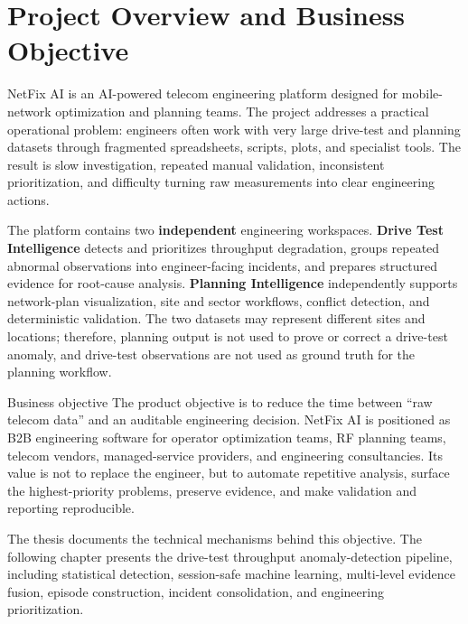 \chapter*{Project Overview and Business Objective}

NetFix AI is an AI-powered telecom engineering platform designed for mobile-network optimization and planning teams. The project addresses a practical operational problem: engineers often work with very large drive-test and planning datasets through fragmented spreadsheets, scripts, plots, and specialist tools. The result is slow investigation, repeated manual validation, inconsistent prioritization, and difficulty turning raw measurements into clear engineering actions.

The platform contains two \textbf{independent} engineering workspaces. \textbf{Drive Test Intelligence} detects and prioritizes throughput degradation, groups repeated abnormal observations into engineer-facing incidents, and prepares structured evidence for root-cause analysis. \textbf{Planning Intelligence} independently supports network-plan visualization, site and sector workflows, conflict detection, and deterministic validation. The two datasets may represent different sites and locations; therefore, planning output is not used to prove or correct a drive-test anomaly, and drive-test observations are not used as ground truth for the planning workflow.

\begin{infobox}{Business objective}
The product objective is to reduce the time between ``raw telecom data'' and an auditable engineering decision. NetFix AI is positioned as B2B engineering software for operator optimization teams, RF planning teams, telecom vendors, managed-service providers, and engineering consultancies. Its value is not to replace the engineer, but to automate repetitive analysis, surface the highest-priority problems, preserve evidence, and make validation and reporting reproducible.
\end{infobox}

The thesis documents the technical mechanisms behind this objective. The following chapter presents the drive-test throughput anomaly-detection pipeline, including statistical detection, session-safe machine learning, multi-level evidence fusion, episode construction, incident consolidation, and engineering prioritization.
